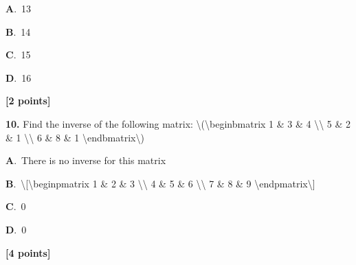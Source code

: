\documentclass[12pt]{article}
\newcommand{\choice}[3]{%
  \noindent\textbf{#1}.~#2\hfill#3\par\vspace{0.25em}
}
\begin{document}
\noindent\choice{A}{{\textenglish{13}}}{}
\noindent\choice{B}{{\textenglish{14}}}{}
\noindent\choice{C}{{\textenglish{15}}}{}
\noindent\choice{D}{{\textenglish{16}}}{}
\hfill \textbf{[2 points]}\vspace{0.5em}

\noindent \textbf{\textenglish{10.}} {\textenglish{Find the inverse of the following matrix: \textbackslash{}(\textbackslash{}begin{bmatrix} 1 \& 3 \& 4 \textbackslash{}\textbackslash{} 5 \& 2 \& 1 \textbackslash{}\textbackslash{} 6 \& 8 \& 1 \textbackslash{}end{bmatrix}\textbackslash{})}}

\noindent\choice{A}{{\textenglish{There is no inverse for this matrix}}}{}
\noindent\choice{B}{{\textenglish{\textbackslash{}[\textbackslash{}begin{pmatrix} 1 \& 2 \& 3 \textbackslash{}\textbackslash{} 4 \& 5 \& 6 \textbackslash{}\textbackslash{} 7 \& 8 \& 9  \textbackslash{}end{pmatrix}\textbackslash{}]}}}{}
\noindent\choice{C}{{\textenglish{0}}}{}
\noindent\choice{D}{{\textenglish{0}}}{}
\hfill \textbf{[4 points]}\vspace{0.5em}
\end{document}
